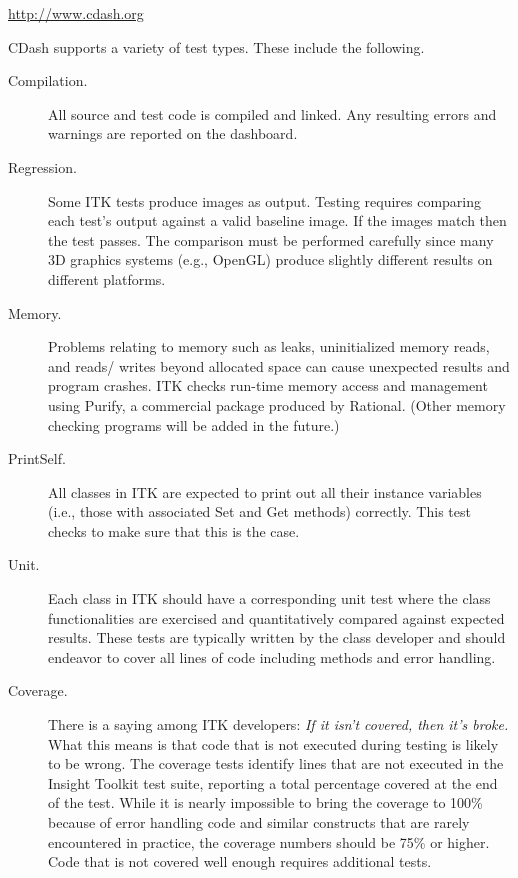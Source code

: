 \begin{center}
\url{http://www.cdash.org}
\end{center}

CDash supports a variety of test types. These include the following.
\begin{description}
        \item[Compilation.] All source and test code is compiled and linked.
        Any resulting errors and warnings are reported on the dashboard.

        \item[Regression.] Some ITK tests produce images as output. Testing
        requires comparing each test's output against a valid baseline image. If
        the images match then the test passes. The comparison must be
        performed carefully since many 3D graphics systems (e.g., OpenGL)
        produce slightly different results on different platforms.

        \item[Memory.] Problems relating to memory such as leaks, uninitialized
        memory reads, and reads/ writes beyond allocated space can cause
        unexpected results and program crashes. ITK checks run-time memory
        access and management using Purify, a commercial package produced by
        Rational. (Other memory checking programs will be added in the future.)

        \item[PrintSelf.] All classes in ITK are expected to print out all
        their instance variables (i.e., those with associated Set and Get
        methods) correctly. This test checks to make sure
        that this is the case.

        \item[Unit.] Each class in ITK should have a corresponding unit test
        where the class functionalities are exercised and quantitatively
        compared against expected results. These tests are typically written
        by the class developer and should endeavor to cover all lines of code
        including  methods and error handling.

       \item[Coverage.] There is a saying among ITK developers: \emph{If it
        isn't covered, then it's broke.} What this means is that
        code that is not executed during testing is likely to be wrong. The
        coverage tests identify lines that are not executed in the
        Insight Toolkit test suite, reporting a total percentage
        covered at the end of the test. While it is nearly impossible to
        bring the coverage to 100\% because of error handling code and similar
        constructs that are rarely encountered in practice, the coverage
        numbers should be 75\% or higher. Code that is not covered well enough
        requires additional tests.
\end{description}


